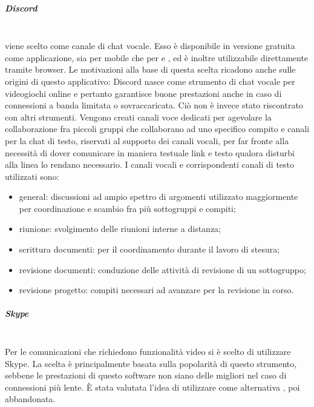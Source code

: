 \subparagraph{Discord}\mbox{}\\
 viene scelto come canale di chat vocale. Esso è disponibile in versione gratuita come applicazione, sia per mobile che per  e \glossario{\Macos}, ed è inoltre utilizzabile direttamente tramite browser. Le motivazioni alla base di questa scelta ricadono anche sulle origini di questo applicativo: Discord nasce come strumento di chat vocale per videogiochi online e pertanto garantisce buone prestazioni anche in caso di connessioni a banda limitata o sovraccaricata. Ciò non è invece stato riscontrato con altri strumenti.
Vengono creati canali voce dedicati per agevolare la collaborazione fra piccoli gruppi che collaborano ad uno specifico compito e canali per la chat di testo, riservati al supporto dei canali vocali, per far fronte alla necessità di dover comunicare in maniera testuale link e testo qualora disturbi alla linea lo rendano necessario.
I canali vocali e corrispondenti canali di testo utilizzati sono:
\begin{itemize}
	\item general: discussioni ad ampio spettro di argomenti utilizzato maggiormente per coordinazione e scambio fra più sottogruppi e compiti;
	\item riunione: svolgimento delle riunioni interne a distanza;
	\item scrittura documenti: per il coordinamento durante il lavoro di stesura;
	\item revisione documenti: conduzione delle attività di revisione di un sottogruppo;
	\item revisione progetto: compiti necessari ad avanzare per la revisione in corso.
\end{itemize}


\subparagraph{Skype}\mbox{}\\
Per le comunicazioni che richiedono funzionalità video si è scelto di utilizzare Skype. La scelta è principalmente basata sulla popolarità di questo strumento, sebbene le prestazioni di questo software non siano delle migliori nel caso di connessioni più lente. \`{E} stata valutata l'idea di utilizzare come alternativa , poi abbandonata.

